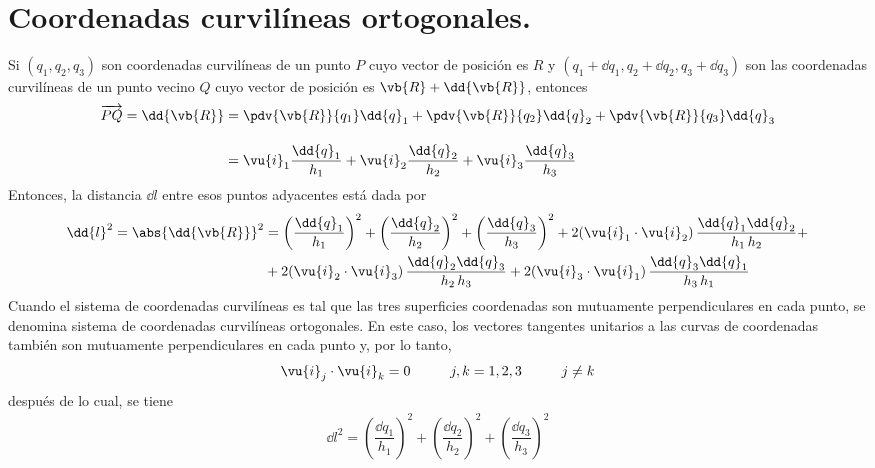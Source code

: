 \section{Coordenadas curvilíneas ortogonales.}
Si $(q_{1}, q_{2}, q_{3})$ son coordenadas curvilíneas de un punto $P$ cuyo vector de posición es $R$ y $(q_{1} + \dd{q_{1}}, q_{2} + \dd{q_{2}}, q_{3} + \dd{q_{3}})$ son las coordenadas curvilíneas de un punto vecino $Q$ cuyo vector de posición es $\vb{R} + \dd{\vb{R}}$, entonces
\begin{align}
\begin{aligned}
\overrightarrow{PQ} = \dd{\vb{R}} &= \pdv{\vb{R}}{q_{1}} \dd{q}_{1} + \pdv{\vb{R}}{q_{2}} \dd{q}_{2} + \pdv{\vb{R}}{q_{3}} \dd{q}_{3} \\[1em]
&= \vu{i}_{1} \dfrac{\dd{q}_{1}}{h_{1}} + \vu{i}_{2} \dfrac{\dd{q}_{2}}{h_{2}} + \vu{i}_{3} \dfrac{\dd{q}_{3}}{h_{3}} 
\end{aligned}
\label{eq:ecuacion_A_02_01}
\end{align}
Entonces, la distancia $\dd{l}$ entre esos puntos adyacentes está dada por
\begin{align}
\begin{aligned}
\dd{l}^{2} = \abs{\dd{\vb{R}}}^{2} &= \left(\dfrac{\dd{q}_{1}}{h_{1}}\right)^{2} + \left(\dfrac{\dd{q}_{2}}{h_{2}}\right)^{2} + \left(\dfrac{\dd{q}_{3}}{h_{3}}\right)^{2} + 2 (\vu{i}_{1} \cdot \vu{i}_{2}) \, \dfrac{\dd{q}_{1} \dd{q}_{2}}{h_{1} \, h_{2}} + \\
&+ 2 (\vu{i}_{2} \cdot \vu{i}_{3}) \, \dfrac{\dd{q}_{2} \dd{q}_{3}}{h_{2} \, h_{3}} + 2 (\vu{i}_{3} \cdot \vu{i}_{1}) \, \dfrac{\dd{q}_{3} \dd{q}_{1}}{h_{3} \, h_{1}}
\end{aligned}
\label{eq:ecuacion_A_02_02}
\end{align}
Cuando el sistema de coordenadas curvilíneas es tal que las tres superficies coordenadas son mutuamente perpendiculares en cada punto, se denomina sistema de coordenadas curvilíneas ortogonales. En este caso, los vectores tangentes unitarios a las curvas de coordenadas también son mutuamente perpendiculares en cada punto y, por lo tanto,
\begin{align}
\vu{i}_{j} \cdot \vu{i}_{k} = 0 \hspace{1cm} j, k = 1, 2, 3 \hspace{1cm} j \neq k
\label{eq:ecuacion_A_02_03}    
\end{align}
después de lo cual, se tiene
\begin{align}
\dd{l}^{2} = \left(\dfrac{\dd{q}_{1}}{h_{1}}\right)^{2} + \left(\dfrac{\dd{q}_{2}}{h_{2}}\right)^{2} + \left(\dfrac{\dd{q}_{3}}{h_{3}}\right)^{2}
\label{eq:ecuacion_A_02_04}    
\end{align}
